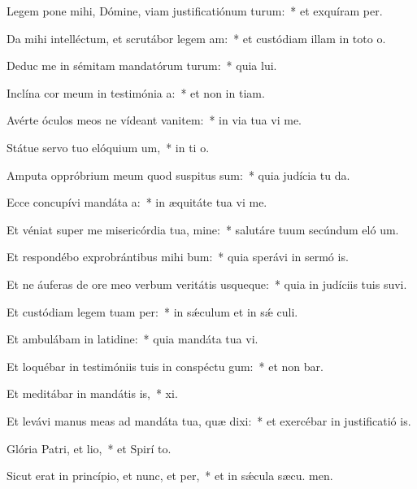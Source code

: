 \item Legem pone mihi, Dómine, viam justificatiónum turum:~* et exquíram  per.
\item Da mihi intelléctum, et scrutábor legem am:~* et custódiam illam in toto  o.
\item Deduc me in sémitam mandatórum turum:~* quia  lui.
\item Inclína cor meum in testimónia a:~* et non in tiam.
\item Avérte óculos meos ne vídeant vanitem:~* in via tua vi me.
\item Státue servo tuo elóquium um,~* in ti o.
\item Amputa oppróbrium meum quod suspitus sum:~* quia judícia tu da.
\item Ecce concupívi mandáta a:~* in æquitáte tua vi me.
\item Et véniat super me misericórdia tua, mine:~* salutáre tuum secúndum eló um.
\item Et respondébo exprobrántibus mihi bum:~* quia sperávi in sermó is.
\item Et ne áuferas de ore meo verbum veritátis usqueque:~* quia in judíciis tuis suvi.
\item Et custódiam legem tuam per:~* in sǽculum et in sǽ culi.
\item Et ambulábam in latidine:~* quia mandáta tua vi.
\item Et loquébar in testimóniis tuis in conspéctu gum:~* et non bar.
\item Et meditábar in mandátis is,~*  xi.
\item Et levávi manus meas ad mandáta tua, quæ dixi:~* et exercébar in justificatió is.
\item Glória Patri, et lio,~* et Spirí to.
\item Sicut erat in princípio, et nunc, et per,~* et in sǽcula sæcu. men.
